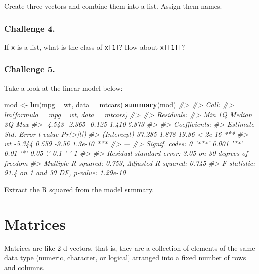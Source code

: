 \documentclass[]{book}
\newenvironment{Shaded}{\begin{snugshade}}{\end{snugshade}}
\newcommand{\KeywordTok}[1]{\textcolor[rgb]{0.13,0.29,0.53}{\textbf{#1}}}
\newcommand{\DataTypeTok}[1]{\textcolor[rgb]{0.13,0.29,0.53}{#1}}
\newcommand{\StringTok}[1]{\textcolor[rgb]{0.31,0.60,0.02}{#1}}
\newcommand{\CommentTok}[1]{\textcolor[rgb]{0.56,0.35,0.01}{\textit{#1}}}
\newcommand{\OperatorTok}[1]{\textcolor[rgb]{0.81,0.36,0.00}{\textbf{#1}}}
\newcommand{\NormalTok}[1]{#1}
\begin{document}
Create three vectors and combine them into a list. Assign them names.

\subsubsection*{Challenge 4.}\label{challenge-4.-2}

If \texttt{x} is a list, what is the class of \texttt{x{[}1{]}}? How
about \texttt{x{[}{[}1{]}{]}}?

\subsubsection*{Challenge 5.}\label{challenge-5.-1}

Take a look at the linear model below:

\begin{Shaded}
\begin{Highlighting}[]
\NormalTok{mod <-}\StringTok{ }\KeywordTok{lm}\NormalTok{(mpg }\OperatorTok{~}\StringTok{ }\NormalTok{wt, }\DataTypeTok{data =}\NormalTok{ mtcars)}
\KeywordTok{summary}\NormalTok{(mod)}
\CommentTok{#> }
\CommentTok{#> Call:}
\CommentTok{#> lm(formula = mpg ~ wt, data = mtcars)}
\CommentTok{#> }
\CommentTok{#> Residuals:}
\CommentTok{#>    Min     1Q Median     3Q    Max }
\CommentTok{#> -4.543 -2.365 -0.125  1.410  6.873 }
\CommentTok{#> }
\CommentTok{#> Coefficients:}
\CommentTok{#>             Estimate Std. Error t value Pr(>|t|)    }
\CommentTok{#> (Intercept)   37.285      1.878   19.86  < 2e-16 ***}
\CommentTok{#> wt            -5.344      0.559   -9.56  1.3e-10 ***}
\CommentTok{#> ---}
\CommentTok{#> Signif. codes:  0 '***' 0.001 '**' 0.01 '*' 0.05 '.' 0.1 ' ' 1}
\CommentTok{#> }
\CommentTok{#> Residual standard error: 3.05 on 30 degrees of freedom}
\CommentTok{#> Multiple R-squared:  0.753,  Adjusted R-squared:  0.745 }
\CommentTok{#> F-statistic: 91.4 on 1 and 30 DF,  p-value: 1.29e-10}
\end{Highlighting}
\end{Shaded}

Extract the R squared from the model summary.

\hypertarget{matrices}{\section{Matrices}\label{matrices}}

Matrices are like 2-d vectors, that is, they are a collection of
elements of the same data type (numeric, character, or logical) arranged
into a fixed number of rows and columns.
\end{document}
